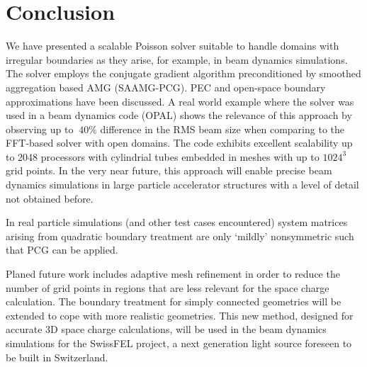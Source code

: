\section{Conclusion}
\label{sec:concl}

We have presented a scalable Poisson solver suitable to handle domains
with irregular boundaries as they arise, for example, in beam dynamics
simulations.  The solver employs the conjugate gradient algorithm
preconditioned by smoothed aggregation based AMG (SAAMG-PCG).  PEC and
open-space boundary approximations have been discussed.  A real world
example where the solver was used in a beam dynamics code (OPAL) shows
the relevance of this approach by observing up to $~40\%$ difference in
the RMS beam size when comparing to the FFT-based solver with open
domains.  The code exhibits excellent scalability up to 2048 processors
with cylindrial tubes embedded in meshes with up to $1024^3$ grid
points.  In the very near future, this approach will enable precise beam
dynamics simulations in large particle accelerator structures with a
level of detail not obtained before.

In real particle simulations (and other test cases encountered) system
matrices arising from quadratic boundary treatment are only `mildly'
nonsymmetric such that PCG can be applied.

Planed future work includes adaptive mesh refinement in order to reduce
the number of grid points in regions that are less relevant for the
space charge calculation.  The boundary treatment for simply connected
geometries will be extended to cope with more realistic geometries.  This
new method, designed for accurate 3D space charge calculations, will be
used in the beam dynamics simulations for the SwissFEL project, a next
generation light source foreseen to be built in Switzerland.

